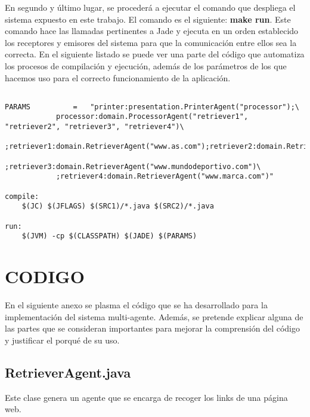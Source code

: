 \documentclass{pre-tfg}
\begin{document}
En segundo y último lugar, se procederá a ejecutar el comando que despliega el sistema expuesto en este trabajo. El comando es el siguiente:
\textbf{make run}. Este comando hace las llamadas pertinentes a Jade y ejecuta en un orden establecido los receptores y emisores del sistema
para que la comunicación entre ellos sea la correcta. En el siguiente listado se puede ver una parte del código que automatiza los procesos de compilación y 
ejecución, además de los parámetros de los que hacemos uso para el correcto funcionamiento de la aplicación.

\begin{lstlisting}[caption=Makefile,style=makefile]

PARAMS 			= 	"printer:presentation.PrinterAgent("processor");\
			processor:domain.ProcessorAgent("retriever1", "retriever2", "retriever3", "retriever4")\
			;retriever1:domain.RetrieverAgent("www.as.com");retriever2:domain.RetrieverAgent("www.sports.es")\
			;retriever3:domain.RetrieverAgent("www.mundodeportivo.com")\
			;retriever4:domain.RetrieverAgent("www.marca.com")" 

compile:
	$(JC) $(JFLAGS) $(SRC1)/*.java $(SRC2)/*.java

run:
	$(JVM) -cp $(CLASSPATH) $(JADE) $(PARAMS)

\end{lstlisting}

\newpage

\appendix
\section{CODIGO}

En el siguiente anexo se plasma el código que se ha desarrollado para la implementación del sistema multi-agente. Además,
se pretende explicar alguna de las partes que se consideran importantes para mejorar la comprensión del código y justificar
el porqué de su uso.

\subsection{RetrieverAgent.java}

Este clase genera un agente que se encarga de recoger los links de una página web.
\end{document}
